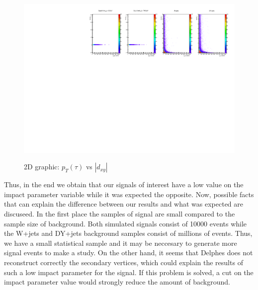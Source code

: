  \begin{figure}[h] 
 \centering
 \caption{2D graphic: $p_T(\tau)$ vs $|d_{xy}|$}
 \includegraphics[width=1.15\textwidth]{./Capitulos/Analysis/ipt1_pt} 
 \label{ipt1_pt}
 \end{figure}
 
Thus, in the end we obtain that our signals of interest have a low value on the impact parameter variable while it was expected the opposite. Now, possible facts that can explain the difference between our results and what was expected are discuseed. In the first place the samples of signal are small compared to the sample size of background. Both simulated signals consist of 10000 events while the W+jets and DY+jets background samples consist of millions of events. Thus, we have a small statistical sample and it may be neccesary to generate more signal events to make a study. On the other hand, it seems that Delphes does not reconstruct correctly the secondary vertices, which could explain the results of such a low impact parameter for the signal. If this problem is solved, a cut on the impact parameter value would strongly reduce the amount of background.




